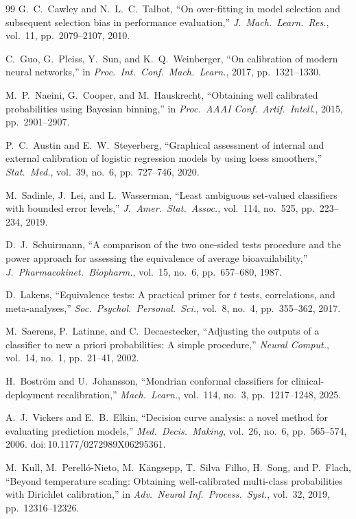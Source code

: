 \begin{thebibliography}{99}
G.~C.~Cawley and N.~L.~C.~Talbot, ``On over-fitting in model selection and subsequent selection bias in performance evaluation,'' \textit{J.\ Mach.\ Learn.\ Res.}, vol.~11, pp.~2079--2107, 2010.

C.~Guo, G.~Pleiss, Y.~Sun, and K.~Q.~Weinberger, ``On calibration of modern neural networks,'' in \textit{Proc.\ Int.\ Conf.\ Mach.\ Learn.}, 2017, pp.~1321--1330.

M.~P.~Naeini, G.~Cooper, and M.~Hauskrecht, ``Obtaining well calibrated probabilities using Bayesian binning,'' in \textit{Proc.\ AAAI Conf.\ Artif.\ Intell.}, 2015, pp.~2901--2907.

P.~C.~Austin and E.~W.~Steyerberg, ``Graphical assessment of internal and external calibration of logistic regression models by using loess smoothers,'' \textit{Stat.\ Med.}, vol.~39, no.~6, pp.~727--746, 2020.

M.~Sadinle, J.~Lei, and L.~Wasserman, ``Least ambiguous set-valued classifiers with bounded error levels,'' \textit{J.\ Amer.\ Stat.\ Assoc.}, vol.~114, no.~525, pp.~223--234, 2019.

D.~J.~Schuirmann, ``A comparison of the two one-sided tests procedure and the power approach for assessing the equivalence of average bioavailability,'' \textit{J.\ Pharmacokinet.\ Biopharm.}, vol.~15, no.~6, pp.~657--680, 1987.

D.~Lakens, ``Equivalence tests: A practical primer for $t$ tests, correlations, and meta-analyses,'' \textit{Soc.\ Psychol.\ Personal.\ Sci.}, vol.~8, no.~4, pp.~355--362, 2017.

M.~Saerens, P.~Latinne, and C.~Decaestecker, ``Adjusting the outputs of a classifier to new a priori probabilities: A simple procedure,'' \textit{Neural Comput.}, vol.~14, no.~1, pp.~21--41, 2002.

H.~Bostr\"{o}m and U.~Johansson, ``Mondrian conformal classifiers for clinical-deployment recalibration,'' \textit{Mach.\ Learn.}, vol.~114, no.~3, pp.~1217--1248, 2025.

A.~J.~Vickers and E.~B.~Elkin, ``Decision curve analysis: a novel method for evaluating prediction models,'' \textit{Med.\ Decis.\ Making}, vol.~26, no.~6, pp.~565--574, 2006. doi:\,10.1177/0272989X06295361.

M.~Kull, M.~Perell\'{o}-Nieto, M.~K\"{a}ngsepp, T.~Silva~Filho, H.~Song, and P.~Flach, ``Beyond temperature scaling: Obtaining well-calibrated multi-class probabilities with Dirichlet calibration,'' in \textit{Adv.\ Neural Inf.\ Process.\ Syst.}, vol.~32, 2019, pp.~12316--12326.


\end{thebibliography}
